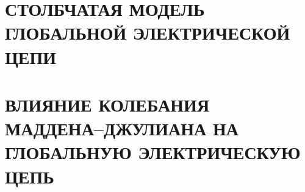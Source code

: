 \documentclass[12pt, russian, a4paper]{article}
\begin{document}
    
    \setcounter{page}{2}

    \tableofcontents
    
    \newpage
    

    \newpage
    \section{СТОЛБЧАТАЯ МОДЕЛЬ ГЛОБАЛЬНОЙ ЭЛЕКТРИЧЕСКОЙ ЦЕПИ}
    
    
    
    \newpage
    \section{ВЛИЯНИЕ КОЛЕБАНИЯ МАДДЕНА--ДЖУЛИАНА НА ГЛОБАЛЬНУЮ ЭЛЕКТРИЧЕСКУЮ ЦЕПЬ}
    
    
    
    
    
    
    
    
    
    \newpage
    
\end{document}
